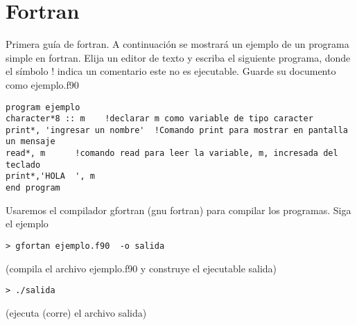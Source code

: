 \documentclass[11pt]{exam}
\begin{document}
\firstpageheadrule
\runningheadrule
{}
\cfoot{ }
\begin{flushleft}
\vspace{0.2in}
\vspace{0.25cm}
\end{flushleft}


\section{Fortran}
 

Primera gu\'ia de fortran. 
A continuaci\'on se mostrar\'a un ejemplo de un programa simple en fortran. Elija un editor de texto
y escriba el siguiente programa, donde el s\'imbolo ! indica un comentario este no es ejecutable. Guarde su documento como ejemplo.f90\\

\begin{verbatim}
program ejemplo
character*8 :: m  	!declarar m como variable de tipo caracter
print*, 'ingresar un nombre'  !Comando print para mostrar en pantalla un mensaje
read*, m	  !comando read para leer la variable, m, incresada del teclado
print*,'HOLA  ', m
end program
\end{verbatim}

Usaremos el compilador gfortran (gnu fortran)  para compilar los programas. Siga el ejemplo\\
\begin{verbatim}
> gfortan ejemplo.f90  -o salida
\end{verbatim}
(compila el archivo ejemplo.f90 y construye el ejecutable salida)
\begin{verbatim}
> ./salida
\end{verbatim}
(ejecuta (corre) el archivo salida)
\end{document}
